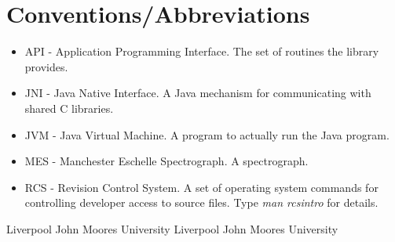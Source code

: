 \documentclass[10pt,a4paper]{article}
\begin{document}
\section{Conventions/Abbreviations}
\begin{itemize}
\item API - Application Programming Interface. The set of routines the library provides.
\item JNI - Java Native Interface. A Java mechanism for communicating with shared C libraries.
\item JVM - Java Virtual Machine. A program to actually run the Java program.
\item MES - Manchester Eschelle Spectrograph. A spectrograph.
\item RCS - Revision Control System. A set of operating system commands for controlling developer access to
source files. Type {\em man rcsintro} for details.
\end{itemize}

\begin{thebibliography}{99}
Liverpool John Moores University 
Liverpool John Moores University 
\end{thebibliography}
\end{document}
